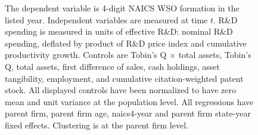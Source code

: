 \documentclass[12pt,english]{article}
\theoremstyle{remark}
\begin{document}
\begin{figure}[p]
	\centering
	\small
	
	\caption{\small The dependent variable is 4-digit NAICS WSO formation in the listed year. Independent variables are measured at time $t$. R\&D spending is measured in units of effective R\&D: nominal R\&D spending, deflated by product of R\&D price index and cumulative productivity growth. Controls are Tobin's Q $\times$ total assets, Tobin's Q, total assets, first difference of sales, cash holdings, asset tangibility, employment, and cumulative citation-weighted patent stock. All displayed controls have been normalized to have zero mean and unit variance at the population level. All regressions have parent firm, parent firm age, naics4-year and parent firm state-year fixed effects. Clustering is at the parent firm level.}
	\label{regs_spinouts_wso4_accounting}
\end{figure}
\end{document}
